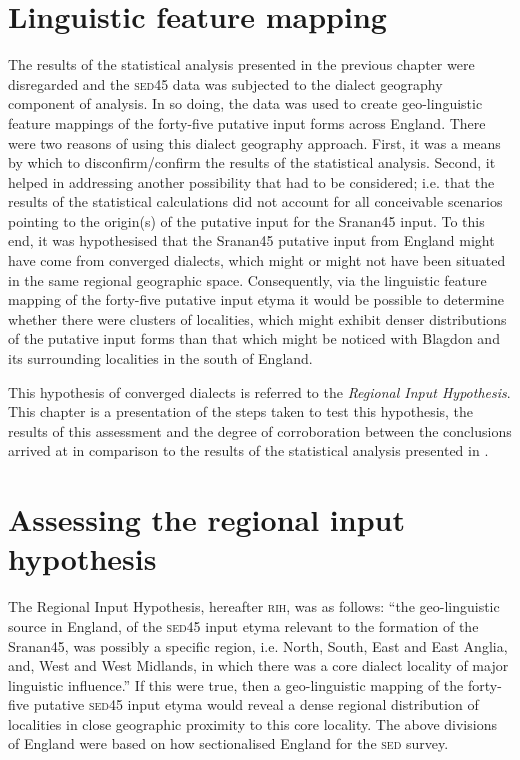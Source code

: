 \section{ Linguistic feature mapping} \label{5.2}
The results of the statistical analysis presented in the previous chapter were disregarded and the \textsc{sed45} data was subjected to the dialect geography component of analysis. In so doing, the data was used to create geo-linguistic feature mappings of the forty-five putative input forms across England. There were two reasons of using this dialect geography approach. First, it was a means by which to disconfirm/confirm the results of the statistical analysis. Second, it helped in addressing another possibility that had to be considered; i.e. that the results of the statistical calculations did not account for all conceivable scenarios pointing to the origin(s) of the putative input for the Sranan45 input. To this end, it was hypothesised that the Sranan45 putative input from England might have come from converged dialects, which might or might not have been situated in the same regional geographic space. Consequently, via the linguistic feature mapping of the forty-five putative input etyma it would be possible to determine whether there were clusters of localities, which might exhibit denser distributions of the putative input forms than that which might be noticed with Blagdon and its surrounding localities in the south of England.

This hypothesis of converged dialects is referred to the \emph{Regional Input Hypothesis}. This chapter is a presentation of the steps taken to test this hypothesis, the results of this assessment and the degree of corroboration between the conclusions arrived at in comparison to the results of the statistical analysis presented in .

\section{Assessing the regional input hypothesis}\label{5.3}
The Regional Input Hypothesis, hereafter \textsc{rih}, was as follows: ``the geo-linguistic source in England, of the \textsc{sed45} input etyma relevant to the formation of the Sranan45, was possibly a specific region, i.e. North, South, East and East Anglia, and, West and West Midlands, in which there was a core dialect locality of major linguistic influence.'' If this were true, then a geo-linguistic mapping of the forty-five putative \textsc{sed45} input etyma would reveal a dense regional distribution of localities in close geographic proximity to this core locality. The above divisions of England were based on how  \citet{Orton6271} sectionalised England for the \textsc{\textsc{sed}} survey.

